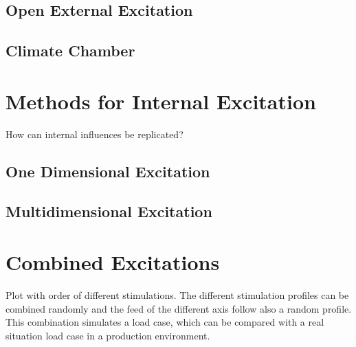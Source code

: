 \subsection{Open External Excitation}
\label{sec:Open_External_Excitation}

\subsection{Climate Chamber}
\label{sec:Climate_Chamber}

\section{Methods for Internal Excitation}
\label{sec:Internal_Excitation}

How can internal influences be replicated?
 

\subsection{One Dimensional Excitation}
\label{sec:1D_stimulation}



\subsection{Multidimensional Excitation}
\label{sec:multideimensional_stimulation}

\section{Combined Excitations}
\label{sec:combined_excitations}

Plot with order of different stimulations. The different stimulation profiles can be combined randomly and the feed of the different axis follow also a random profile. This combination simulates a load case, which can be compared with a real situation load case in a production environment.





 


